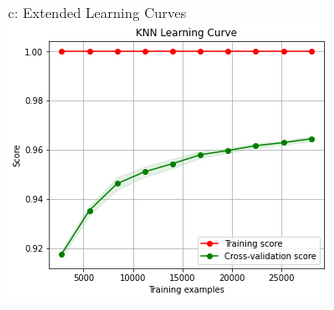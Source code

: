 \documentclass{article}
\begin{document}
\begin{figure}
\begin{subfigure}{.34\textwidth}
	\end{subfigure}
	\begin{subfigure}{.34\textwidth}
		\centering
		c: Extended Learning Curves\\
		\includegraphics[width=\linewidth]{mnist_knn_learning2.png}
		
	\end{subfigure}
	\label{fig:test}
\end{figure}
\end{document}
